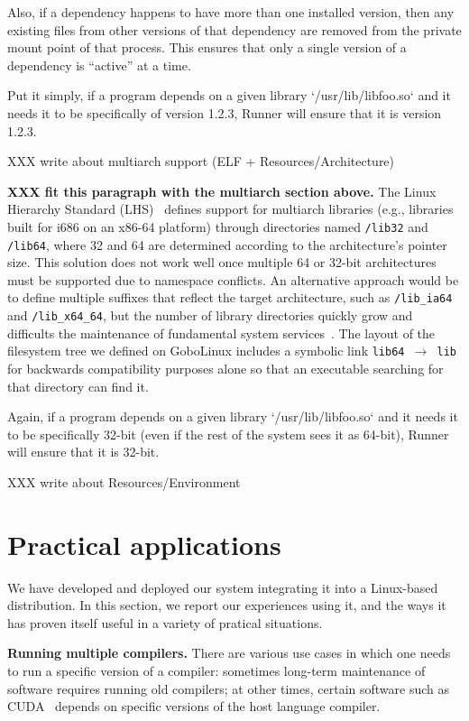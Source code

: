 \documentclass[sigplan, anonymous, 10pt]{acmart}
\begin{document}
Also, if a dependency happens to have more than
one installed version, then any existing files from other versions of that
dependency are removed from the private mount point of that process. This
ensures that only a single version of a dependency is ``active'' at a time.

Put it simply, if a program depends on a given library `/usr/lib/libfoo.so` and it
needs it to be specifically of version 1.2.3, Runner will ensure that it is
version 1.2.3.

XXX write about multiarch support (ELF + Resources/Architecture)
\lipsum[7]

\textbf{XXX fit this paragraph with the multiarch section above.}
The Linux Hierarchy Standard (LHS)~\cite{lsb2015:fhs} defines support for
multiarch libraries (e.g., libraries built for i686 on an x86-64 platform)
through directories named \texttt{/lib32} and \texttt{/lib64},
where 32 and 64 are determined according to the architecture's pointer size.
This solution does not work well once multiple 64 or 32-bit architectures must
be supported due to namespace conflicts. An alternative approach would be to define
multiple suffixes that reflect the target architecture, such as \texttt{/lib\_ia64}
and \texttt{/lib\_x64\_64}, but the number of library directories quickly grow and
difficults the maintenance of fundamental system services~\cite{heen2005:thesis}.
The layout of the filesystem tree we defined on GoboLinux includes a symbolic link
\texttt{lib64 $\rightarrow$ lib} for backwards compatibility purposes alone so that
an executable searching for that directory can find it.

Again, if a program depends on a given library `/usr/lib/libfoo.so` and it
needs it to be specifically 32-bit (even if the rest of the system sees it
as 64-bit), Runner will ensure that it is 32-bit.

XXX write about Resources/Environment
\lipsum[8]

\section{Practical applications}\label{sec:applications}
We have developed and deployed our system integrating it into a Linux-based
distribution. In this section, we report our experiences using it, and the ways it has
proven itself useful in a variety of pratical situations.

\textbf{Running multiple compilers.}
There are various use cases in which one needs to run a specific version of
a compiler: sometimes long-term maintenance of software requires running
old compilers; at other times, certain software such as CUDA~\cite{nickolls2008:cuda}
depends on specific versions of the host language compiler.
\end{document}
